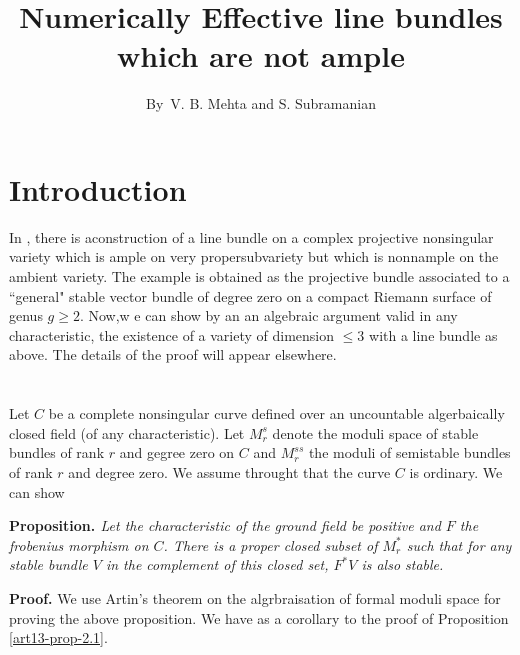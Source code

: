 \title{Numerically Effective line bundles which are not ample}

\author{By~V. B. Mehta and S. Subramanian}


\date{}
\maketitle

\section{Introduction}\label{art13-sec-1}
In \cite{art13-key6}, there is a\pageoriginale construction of a line bundle on a complex projective nonsingular variety which is ample on very propersubvariety but which is nonnample on the ambient variety. The example is obtained as the projective bundle associated to a ``general" stable vector bundle of degree zero on a compact Riemann surface of genus $g \geq 2$. Now,w e can show by an an algebraic argument valid in any characteristic, the existence of a variety of dimension $\leq 3$ with a line bundle as above. The details of the proof will appear elsewhere.

\section{}\label{art13-sec-2}
Let $C$ be a complete  nonsingular curve defined over an uncountable algerbaically closed field (of any characteristic). Let $M_{r}^{s}$ denote the moduli space of stable bundles of rank $r$ and gegree zero on $C$ and $M_{r}^{ss}$ the moduli of semistable bundles of rank $r$ and degree zero. We assume throught that the curve $C$ is ordinary. We can show

\medskip
\noindent
{\bfseries {} Proposition. \label{art13-prop-2.1}} \textit{Let the characteristic of the ground field be positive and $F$ the frobenius morphism on $C$. There is a proper closed subset of $M_{r}^{*}$ such that for any stable bundle $V$ in the complement of this closed set, $F^{*}V$ is also stable.}

\medskip
\noindent
{\bfseries Proof.} We use Artin's theorem on the algrbraisation of formal moduli space for proving the above proposition. We have as a corollary to the proof of Proposition \eqref{art13-prop-2.1}.

